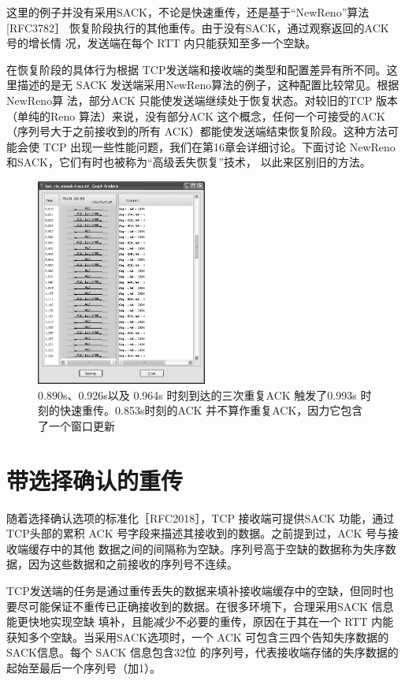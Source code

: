这里的例子并没有采用SACK，不论是快速重传，还是基于“NewReno”算法[RFC3782］ 恢复阶段执行的其他重传。由于没有SACK，通过观察返回的ACK 号的增长情
况，发送端在每个 RTT 内只能获知至多一个空缺。

在恢复阶段的具体行为根据 TCP发送端和接收端的类型和配置差异有所不同。这里描述的是无 SACK 发送端采用NewReno算法的例子，这种配置比较常见。根据NewReno算
法，部分ACK 只能使发送端继续处于恢复状态。对较旧的TCP 版本（单纯的Reno 算法）来说，没有部分ACK 这个概念，任何一个可接受的ACK（序列号大于之前接收到的所有
ACK）都能使发送端结束恢复阶段。这种方法可能会使 TCP 出现一些性能问题，我们在第16章会详细讨论。下面讨论 NewReno和SACK，它们有时也被称为“高级丢失恢复”技术，
以此来区别旧的方法。
\begin{figure}[!htb]
    \centering
	\includegraphics[width=0.5\textwidth]{imgs/14/14-8.png}
	\caption{0.890s、0.926s以及 0.964s 时刻到达的三次重复ACK 触发了0.993s 时刻的快速重传。0.853s时刻的ACK 并不算作重复ACK，因力它包含了一个窗口更新}
\end{figure}

\section{带选择确认的重传}

随着选择确认选项的标准化［RFC2018］，TCP 接收端可提供SACK 功能，通过TCP头部的累积 ACK 号字段来描述其接收到的数据。之前提到过，ACK 号与接收端缓存中的其他
数据之间的间隔称为空缺。序列号高于空缺的数据称为失序数据，因为这些数据和之前接收的序列号不连续。

TCP发送端的任务是通过重传丢失的数据来填补接收端缓存中的空缺，但同时也要尽可能保证不重传已正确接收到的数据。在很多环境下，合理采用SACK 信息能更快地实现空缺
填补，且能减少不必要的重传，原因在于其在一个 RTT 内能获知多个空缺。当采用SACK选项时，一个 ACK 可包含三四个告知失序数据的SACK信息。每个 SACK 信息包含32位
的序列号，代表接收端存储的失序数据的起始至最后一个序列号（加1）。

